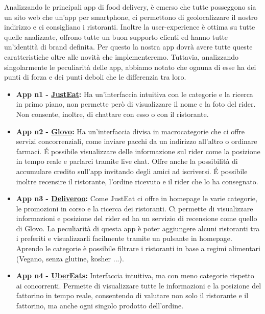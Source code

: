 \documentclass{article}
\begin{document}
     \par
    \newpage
    \vspace{0.5cm}
    Analizzando le principali app di food delivery, è emerso che tutte posseggono sia un sito web che un'app per smartphone, ci permettono di geolocalizzare il nostro indirizzo e ci consigliano i ristoranti. Inoltre la user-experience è ottima su tutte quelle analizzate, offrono tutte un buon supporto clienti ed hanno tutte un'identità di brand definita. Per questo la nostra app dovrà avere tutte queste caratteristiche oltre alle novità che implementeremo. Tuttavia, analizzando singolarmente le peculiarità delle app, abbiamo notato che ognuna di esse ha dei punti di forza e dei punti deboli che le differenzia tra loro.\vspace{0,7cm}
\begin{itemize}
        \item \textbf{App n1 - \href{https://www.justeat.it}{JustEat}:} Ha un’interfaccia intuitiva con le categorie e la ricerca in primo piano, non permette però di visualizzare il nome e la foto del rider. Non consente, inoltre, di chattare con esso o con il ristorante.\vspace{0.3cm}

        \item \textbf{App n2 - \href{https://glovoapp.com/it/it/}{Glovo}:} Ha un'interfaccia divisa in macrocategorie che ci offre servizi concorrenziali, come inviare pacchi da un indirizzo all’altro o ordinare farmaci. É possibile visualizzare delle informazione sul rider come la posizione in tempo reale e parlarci tramite live chat. Offre anche la possibilità di accumulare credito sull’app invitando degli amici ad iscriversi. É possibile inoltre recensire il ristorante, l’ordine ricevuto e il rider che lo ha consegnato.\vspace{0.3cm}

        \item \textbf{App n3 - \href{https://deliveroo.it/it/}{Deliveroo}:} Come JustEat ci offre in homepage le varie categorie, le promozioni in corso e la ricerca dei ristoranti. Ci permette di visualizzare informazioni e posizione del rider ed ha un servizio di recensione come quello di Glovo. La peculiarità di questa app è poter aggiungere alcuni ristoranti tra i preferiti e visualizzarli facilmente tramite un pulsante in homepage. Aprendo le categorie è possibile filtrare i ristoranti in base a regimi alimentari (Vegano, senza glutine, kosher ...).\vspace{0.3cm}

        \item \textbf{App n4 - \href{https://www.ubereats.com/it}{UberEats}:} Interfaccia intuitiva, ma con meno categorie rispetto ai concorrenti. Permette di visualizzare tutte le informazioni e la posizione del fattorino in tempo reale, consentendo di valutare non solo il ristorante e il fattorino, ma anche ogni singolo prodotto dell'ordine.\vspace{0.3cm}

    

\end{itemize}
\end{document}
